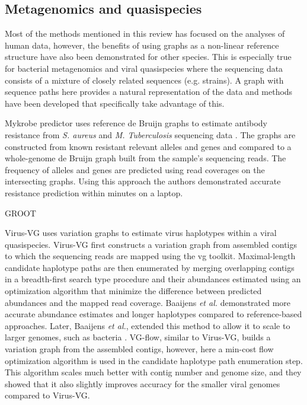 \subsection{Metagenomics and quasispecies}

Most of the methods mentioned in this review has focused on the analyses of human data, however, the benefits of using graphs as a non-linear reference structure have also been demonstrated for other species.
This is especially true for bacterial metagenomics and viral quasispecies where the sequencing data consists of a mixture of closely related sequences (e.g. strains).
A graph with sequence paths here provides a natural representation of the data and methods have been developed that specifically take advantage of this. 

Mykrobe predictor uses reference de Bruijn graphs to estimate antibody resistance from \textit{S. aureus} and \textit{M. Tuberculosis} sequencing data \cite{Bradley2015-kl}.
The graphs are constructed from known resistant relevant alleles and genes and compared to a whole-genome de Bruijn graph built from the sample's sequencing reads.
The frequency of alleles and genes are predicted using read coverages on the intersecting graphs.
Using this approach the authors demonstrated accurate resistance prediction within minutes on a laptop.  

GROOT \cite{Rowe2018-bg}

Virus-VG uses variation graphs to estimate virus haplotypes within a viral quasispecies.
Virus-VG first constructs a variation graph from assembled contigs to which the sequencing reads are mapped using the vg toolkit.
Maximal-length candidate haplotype paths are then enumerated by merging overlapping contigs in a breadth-first search type procedure and their abundances estimated using an optimization algorithm that minimize the difference between predicted abundances and the mapped read coverage. 
Baaijens \textit{et al.} demonstrated more accurate abundance estimates and longer haplotypes compared to reference-based approaches.
Later, Baaijens \textit{et al.}, extended this method to allow it to scale to larger genomes, such as bacteria \cite{Baaijens2019-ha}.
VG-flow, similar to Virus-VG, builds a variation graph from the assembled contigs, however, here a min-cost flow optimization algorithm is used in the candidate haplotype path enumeration step.
This algorithm scales much better with contig number and genome size, and they showed that it also slightly improves accuracy for the smaller viral genomes compared to Virus-VG. 

